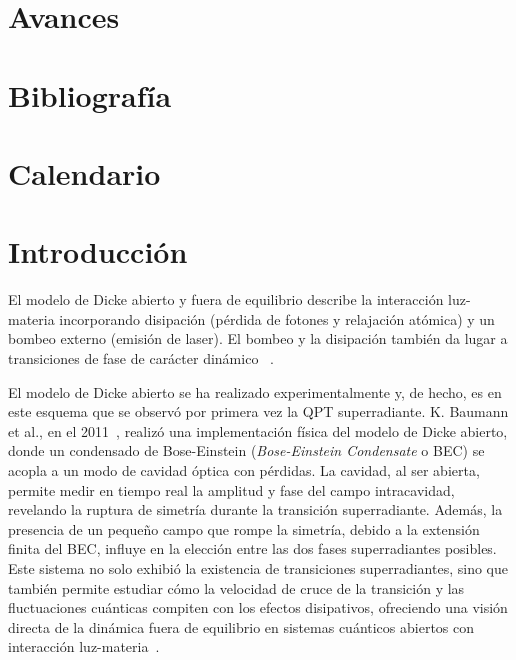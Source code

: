 \documentclass[onecolumn,notitlepage,letterpaper,aps,pra,12pt]{article}
\numberwithin{equation}{section}
\begin{document}
\section{Avances}

\section{Bibliografía}

\section{Calendario}





\clearpage
\section{Introducción}







El modelo de Dicke abierto y fuera de equilibrio describe la interacción luz-materia incorporando disipación (pérdida de fotones y relajación atómica) y un bombeo externo (emisión de laser). El bombeo y la disipación también da lugar a transiciones de fase de carácter dinámico%
~\cite{kirton2017,LeBoite2020}. 

El modelo de Dicke abierto se ha realizado experimentalmente y, de hecho, es en este esquema que se observó por primera vez la QPT superradiante. K. Baumann et al., en el 2011~\cite{Baumann11}, realizó una implementación física del modelo de Dicke abierto, donde un condensado de Bose-Einstein (\textit{Bose-Einstein Condensate} o BEC) se acopla a un modo de cavidad óptica con pérdidas. La cavidad, al ser abierta, permite medir en tiempo real la amplitud y fase del campo intracavidad, revelando la ruptura de simetría durante la transición superradiante. Además, la presencia de un pequeño campo que rompe la simetría, debido a la extensión finita del BEC, influye en la elección entre las dos fases superradiantes posibles. Este sistema no solo exhibió la existencia de transiciones superradiantes, sino que también permite estudiar cómo la velocidad de cruce de la transición y las fluctuaciones cuánticas compiten con los efectos disipativos, ofreciendo una visión directa de la dinámica fuera de equilibrio en sistemas cuánticos abiertos con interacción luz-materia~\cite{Baumann10}.
\end{document}
